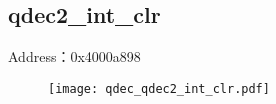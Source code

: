 \subsection{qdec2\_int\_clr}
\label{qdec-qdec2-int-clr}
Address：0x4000a898
 \begin{figure}[H]
\texttt{[image: qdec\_qdec2\_int\_clr.pdf]}
\end{figure}

